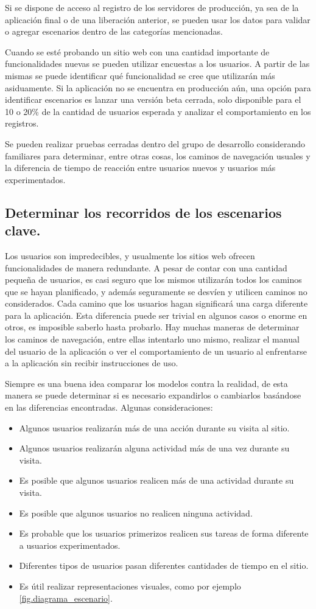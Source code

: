 Si se dispone de acceso al registro de los servidores de producción, ya sea de la aplicación final o de una liberación anterior, se pueden usar los datos para validar o agregar
escenarios dentro de las categorías mencionadas.

Cuando se esté probando un sitio web con una cantidad importante de funcionalidades nuevas se pueden utilizar encuestas a los usuarios. A partir de las mismas se puede
identificar qué funcionalidad se cree que utilizarán más asiduamente. Si la aplicación no se encuentra en producción aún, una opción para identificar escenarios es lanzar una versión beta
cerrada, solo disponible para el 10 o 20\% de la cantidad de usuarios esperada y analizar el comportamiento en los registros.

Se pueden realizar pruebas cerradas dentro del grupo de desarrollo considerando familiares para determinar, entre otras cosas, los caminos de navegación usuales y la diferencia de
tiempo de reacción entre usuarios nuevos y usuarios más experimentados.

\subsection{Determinar los recorridos de los escenarios clave.}
Los usuarios son impredecibles, y usualmente los sitios web ofrecen funcionalidades de manera redundante. A pesar de contar con una cantidad pequeña de usuarios, es casi seguro
que los mismos utilizarán todos los caminos que se hayan planificado, y además seguramente se desvíen y utilicen caminos no considerados. Cada camino que los usuarios hagan
significará una carga diferente para la aplicación. Esta diferencia puede ser trivial en algunos casos o enorme en otros, es imposible saberlo hasta probarlo. Hay muchas maneras de
determinar los caminos de navegación, entre ellas intentarlo uno mismo, realizar el manual del usuario de la aplicación o ver el comportamiento de un usuario al enfrentarse a la aplicación sin recibir instrucciones de uso.

Siempre es una buena idea comparar los modelos contra la realidad, de esta manera se puede determinar si es necesario expandirlos o cambiarlos basándose en las diferencias
encontradas.
Algunas consideraciones:
\begin{itemize}
	\item
	Algunos usuarios realizarán más de una acción durante su visita al sitio.
	\item
	Algunos usuarios realizarán alguna actividad más de una vez durante su visita.
	\item
	Es posible que algunos usuarios realicen más de una actividad durante su visita.
	\item
	Es posible que algunos usuarios no realicen ninguna actividad.
	\item
	Es probable que los usuarios primerizos realicen sus tareas de forma diferente a usuarios experimentados.
	\item
	Diferentes tipos de usuarios pasan diferentes cantidades de tiempo en el sitio.
	\item
	Es útil realizar representaciones visuales, como por ejemplo \ref{fig.diagrama_escenario}.
\end{itemize}

